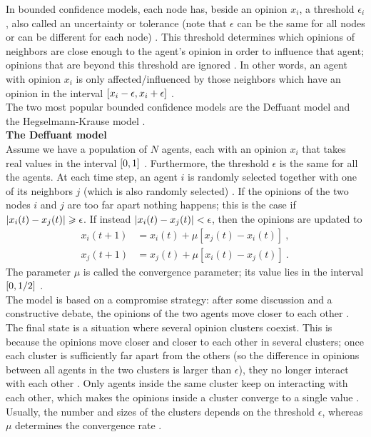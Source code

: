\documentclass[11 pt , letterpaper , twoside , openright]{book}
\begin{document}
In bounded confidence models, each node has, beside an opinion $x_i$, a threshold $\epsilon_i$, also called an uncertainty or tolerance (note that $\epsilon$ can be the same for all nodes or can be different for each node) \cite{Castellano2009}\cite{Deffuant2006}. This threshold determines which opinions of neighbors are close enough to the agent's opinion in order to influence that agent; opinions that are beyond this threshold are ignored \cite{Deffuant2006}. In other words, an agent with opinion $x_i$ is only affected/influenced by those neighbors which have an opinion in the interval $\interval{x_i-\epsilon}{x_i+\epsilon}$ \cite{Castellano2009}. \\
The two most popular bounded confidence models are the Deffuant model and the Hegselmann-Krause model \cite{Castellano2009}. \\
\newline
\textbf{The Deffuant model}\\
\newline
Assume we have a population of $N$ agents, each with an opinion $x_i$ that takes real values in the interval $\interval{0}{1}$ \cite{Castellano2009}. Furthermore, the threshold $\epsilon$ is the same for all the agents. At each time step, an agent $i$ is randomly selected together with one of its neighbors $j$ (which is also randomly selected) \cite{Castellano2009}. If the opinions of the two nodes $i$ and $j$ are too far apart nothing happens; this is the case if $\abs{x_i(t) - x_j(t)} \geqslant \epsilon$. If instead $\abs{x_i(t) - x_j(t)} < \epsilon$, then the opinions are updated to \cite{Castellano2009}
\begin{equation}
\begin{split}
	x_i(t+1) &= x_i(t) + \mu [x_j(t) - x_i(t)] \ ,\\
	x_j(t+1) &= x_j(t) + \mu [x_i(t) - x_j(t)] \ .
\end{split}
\end{equation}
The parameter $\mu$ is called the convergence parameter; its value lies in the interval $\interval{0}{1/2}$ \cite{Castellano2009}. \\
The model is based on a compromise strategy: after some discussion and a constructive debate, the opinions of the two agents move closer to each other \cite{Castellano2009}. \\
The final state is a situation where several opinion clusters coexist. This is because the opinions move closer and closer to each other in several clusters; once each cluster is sufficiently far apart from the others (so the difference in opinions between all agents in the two clusters is larger than $\epsilon$), they no longer interact with each other \cite{Castellano2009}. Only agents inside the same cluster keep on interacting with each other, which makes the opinions inside a cluster converge to a single value \cite{Castellano2009}. Usually, the number and sizes of the clusters depends on the threshold $\epsilon$, whereas $\mu$ determines the convergence rate \cite{Castellano2009}.\\
\end{document}
